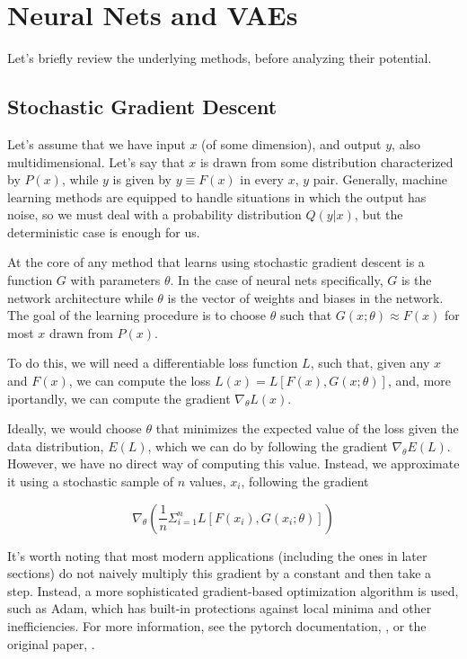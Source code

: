 \documentclass[aps,prl,preprint,groupedaddress]{revtex4-1}
\begin{document}
\section{Neural Nets and VAEs}


Let's briefly review the underlying methods, before analyzing their potential.

\subsection{ Stochastic Gradient Descent}

Let's assume that we have input $x$ (of some dimension), and output $y$, also multidimensional. Let's say that $x$ is drawn from some distribution characterized by $P(x)$, while $y$ is given by $y \equiv F(x)$ in every $x$, $y$ pair. Generally, machine learning methods are equipped to handle situations in which the output has noise, so we must deal with a probability distribution $Q(y|x)$, but the deterministic case is enough for us.

At the core of any method that learns using stochastic gradient descent is a function $G$ with parameters $\theta$. In the case of neural nets specifically, $G$ is the network architecture while $\theta$ is the vector of weights and biases in the network. The goal of the learning procedure is to choose $\theta$ such that $G(x;\theta) \approx F(x)$ for most $x$ drawn from $P(x)$.

To do this, we will need a differentiable loss function $L$, such that, given any $x$ and $F(x)$, we can compute the loss $L(x) = L[F(x), G(x; \theta)]$, and, more iportandly, we can compute the gradient $\nabla_{\theta} L (x)$.

Ideally, we would choose $\theta$ that minimizes the expected value of the loss given the data distribution, $E(L)$, which we can do by following the gradient $\nabla_{\theta} E(L)$. However, we have no direct way of computing this value. Instead, we approximate it using a stochastic sample of $n$ values, $x_i$, following the gradient

$$ \nabla_{\theta} \left( \frac{1}{n}\Sigma_{i = 1}^n L[F(x_i), G(x_i; \theta)] \right) $$

It's worth noting that most modern applications (including the ones in later sections) do not naively multiply this gradient by a constant and then take a step. Instead, a more sophisticated gradient-based optimization algorithm is used, such as Adam, which has built-in protections against local minima and other inefficiencies. For more information, see the pytorch documentation, \cite{adamdocumentation}, or the original paper, \cite{adampaper}.
\end{document}
